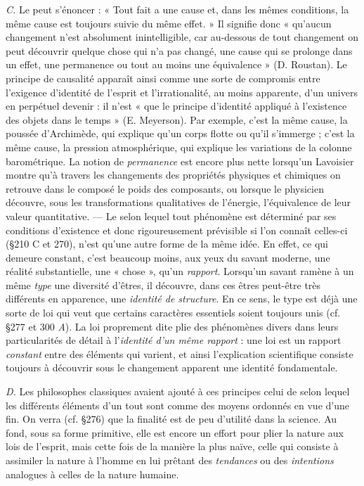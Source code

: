 {\it C.} Le  peut s’énoncer : « Tout fait a une cause
et, dans les mêmes conditions, la même cause est toujours suivie du
même effet. » Il signifie donc « qu'aucun changement n’est absolument inintelligible, car au-dessous de tout changement on peut
découvrir quelque chose qui n’a pas changé, une cause qui se prolonge
dans un effet, une permanence ou tout au moins une équivalence »
(D. Roustan). Le principe de causalité apparaît ainsi comme une
sorte de compromis entre l'exigence d’identité de l'esprit et l’irrationalité, au moins apparente, d’un univers en perpétuel devenir : il
n’est « que le principe d'identité appliqué à l'existence des objets
dans le temps » (E. Meyerson). Par exemple, c’est la même cause, la
poussée d’Archimède, qui explique qu’un corps flotte ou qu’il s’immerge ; c’est la même cause, la pression atmosphérique, qui explique
les variations de la colonne barométrique. La notion de {\it permanence}
est encore plus nette lorsqu'un Lavoisier montre qu’à travers les
changements des propriétés physiques et chimiques on retrouve
dans le composé le poids des composants, ou lorsque le physicien
découvre, sous les transformations qualitatives de l’énergie, l’équivalence de leur valeur quantitative. — Le 
selon lequel tout phénomène est déterminé par ses conditions d’existence et donc rigoureusement prévisible si l’on connaît celles-ci
(\S 210 C et 270), n’est qu’une autre forme de la même idée. En effet,
ce qui demeure constant, c’est beaucoup moins, aux yeux du savant
moderne, une réalité substantielle, une « chose », qu’un {\it rapport}.
Lorsqu'un savant ramène à un même {\it type} une diversité d’êtres, il
découvre, dans ces êtres peut-être très différents en apparence, une
{\it identité de structure}. En ce sens, le type est déjà une sorte de loi qui
veut que certains caractères essentiels soient toujours unis (cf. \S 277
et 300 {\it A}). La loi proprement dite plie des phénomènes divers dans leurs
particularités de détail à l’{\it identité d’un même rapport} : une loi est un
rapport {\it constant} entre des éléments qui varient, et ainsi l’explication
scientifique consiste toujours à découvrir sous le changement apparent
une identité fondamentale.

{\it D.} Les philosophes classiques avaient ajouté à ces principes celui de
 selon lequel les différents éléments d’un tout sont comme des
moyens ordonnés en vue d’une fin. On verra (cf. \S 276) que la finalité est de peu d’utilité dans la science. Au fond, sous sa forme primitive,
elle est encore un effort pour plier la nature aux lois de l’esprit, mais
cette fois de la manière la plus naïve, celle qui consiste à assimiler la
nature à l’homme en lui prêtant des {\it tendances} ou des {\it intentions} analogues
à celles de la nature humaine.

